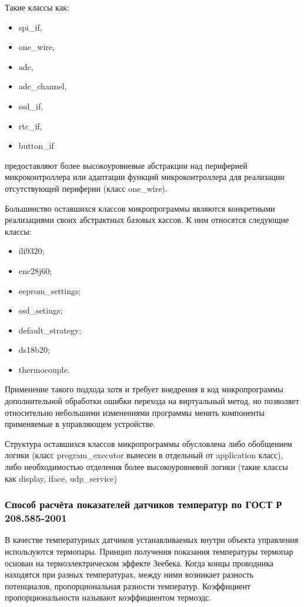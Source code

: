 Такие классы как:
\begin{itemize}
	\item spi\_if,
	\item one\_wire,
	\item adc,
	\item adc\_channel,
	\item ssd\_if,
	\item rtc\_if,
	\item button\_if
\end{itemize}
предоставляют более высокоуровневые абстракции над периферией микроконтроллера или адаптации
функций микроконтроллера для реализации отсутствующей периферии (класс one\_wire).

Большинство оставшихся классов микропрограммы являются конкретными реализациями своих
абстрактных базовых кассов. К ним относятся следующие классы:
\begin{itemize}
	\item ili9320;
	\item enc28j60;
	\item eeprom\_settings;
	\item ssd\_setings;
	\item default\_strategy;
	\item ds18b20;
	\item thermocouple.
\end{itemize}
Применение такого подхода хотя и требует внедрения в код микропрограммы дополнительной
обработки ошибки перехода на виртуальный метод, но позволяет относительно
небольшими изменениями программы менять компоненты применяемые в управляющем устройстве.

Структура оставшихся классов микропрограммы обусловлена либо обобщением логики (класс program\_executor
вынесен в отдельный от application класс), либо необходимостью отделения более высокоуровневой логики
(такие классы как display, iface, udp\_service)



\subsubsection{Способ расчёта показателей датчиков температур по ГОСТ Р 208.585-2001}
В качестве температурных датчиков устанавливаемых внутри объекта управления используются
термопары. Принцип получения показания температуры термопар основан на
термоэлектрическом эффекте Зеебека. Когда концы проводника находятся при разных температурах,
между ними возникает разность потенциалов, пропорциональная разности температур.
Коэффициент пропорциональности называют коэффициентом термоэдс.

